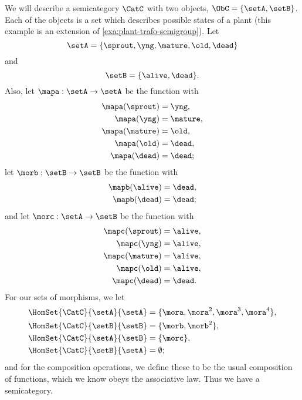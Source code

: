 \begin{example}
    \label{exa:semicat-plant-states}
    We will describe a semicategory $\CatC$ with two objects, $\ObC = \{ \setA, \setB \}$. Each of the objects is a set which describes possible states of a plant (this example is an extension of \cref{exa:plant-trafo-semigroup}).
    Let
    \begin{equation}
        \setA = \{ \sprout, \yng, \mature, \old, \dead \}
    \end{equation}
    and
    \begin{equation}
        \setB = \{ \alive, \dead \}.
    \end{equation}
    Also, let $\mapa : \setA \to \setA$ be the function with
    \begin{align*}
        \mapa(\sprout) &=  \yng, \\
        \mapa(\yng) &=  \mature, \\
        \mapa(\mature) &=  \old, \\
        \mapa( \old) &= \dead, \\
        \mapa (\dead) &= \dead;
    \end{align*}
    let $\morb : \setB \to \setB$ be the function with
    \begin{align*}
        \mapb(\alive) &=  \dead, \\
        \mapb(\dead) &=  \dead;
    \end{align*}
    and let $\morc : \setA \to \setB$ be the function with
    \begin{align*}
        \mapc(\sprout) &= \alive, \\
        \mapc(\yng) &=  \alive, \\
        \mapc(\mature) &= \alive , \\
        \mapc( \old) &= \alive, \\
        \mapc (\dead) &= \dead.
    \end{align*}
    For our sets of morphisms, we let
    \begin{align*}
        \HomSet{\CatC}{\setA}{\setA} &= \{ \mora, \mora^2, \mora^3, \mora^4 \}, \\
        \HomSet{\CatC}{\setB}{\setB} &=  \{ \morb, \morb^2 \}, \\
        \HomSet{\CatC}{\setA}{\setB} &=  \{ \morc \}, \\
        \HomSet{\CatC}{\setB}{\setA} &= \emptyset;
    \end{align*}
    and for the composition operations, we define these to be the usual composition of functions, which we know obeys the associative law. Thus we have a semicategory.
\end{example}


